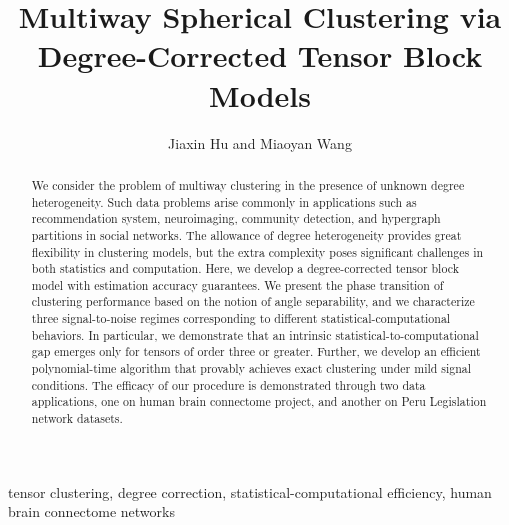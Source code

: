 \documentclass[lettersize,journal]{IEEEtran}
\theoremstyle{definition}
\theoremstyle{definition}
\begin{document}
\title{Multiway Spherical Clustering via \\ Degree-Corrected Tensor Block Models}

\author{ Jiaxin Hu and Miaoyan Wang
}



\maketitle

\begin{abstract}
We consider the problem of multiway clustering in the presence of unknown degree heterogeneity. Such data problems arise commonly in applications such as recommendation system, neuroimaging, community detection, and hypergraph partitions in social networks. The allowance of degree heterogeneity provides great flexibility in clustering models, but the extra complexity poses significant challenges in both statistics and computation. Here, we develop a degree-corrected tensor block model with estimation accuracy guarantees. We present the phase transition of clustering performance based on the notion of angle separability, and we characterize three signal-to-noise regimes corresponding to different statistical-computational behaviors. In particular, we demonstrate that an intrinsic statistical-to-computational gap emerges only for tensors of order three or greater. Further, we develop an efficient polynomial-time algorithm that provably achieves exact clustering under mild signal conditions. The efficacy of our procedure is demonstrated through two data applications, one on human brain connectome project, and another on Peru Legislation network datasets. 
\end{abstract}

\begin{IEEEkeywords}
tensor clustering, degree correction, statistical-computational efficiency, human brain connectome networks
\end{IEEEkeywords}
\end{document}

